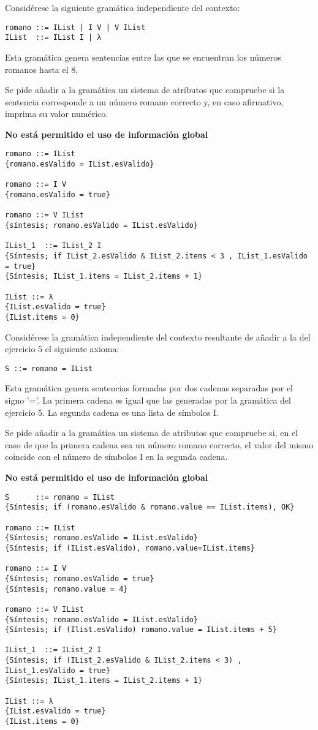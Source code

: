 \begin{problem}[5]
Considérese la siguiente gramática independiente del contexto:
\begin{verbatim}
romano ::= IList | I V | V IList
IList  ::= IList I | λ
\end{verbatim}
Esta gramática genera sentencias entre las que se encuentran los números romanos hasta el 8.

Se pide añadir a la gramática un sistema de atributos que compruebe si la sentencia corresponde a un número romano correcto y, en caso afirmativo, imprima su valor numérico.

\textbf{No está permitido el uso de información global}
\solution
\begin{verbatim}
romano ::= IList
{romano.esValido = IList.esValido}

romano ::= I V
{romano.esValido = true}

romano ::= V IList
{síntesis; romano.esValido = IList.esValido}

IList_1  ::= IList_2 I
{Síntesis; if IList_2.esValido & IList_2.items < 3 , IList_1.esValido = true}
{Síntesis; IList_1.items = IList_2.items + 1}

IList ::= λ
{IList.esValido = true}
{IList.items = 0}
\end{verbatim}
\end{problem}

\begin{problem}[6]
Considérese la gramática independiente del contexto resultante de añadir a la del ejercicio 5 el siguiente axioma:
\begin{verbatim}
S ::= romano = IList
\end{verbatim}
Esta gramática genera sentencias formadas por dos cadenas separadas por el signo '='. La primera cadena es igual que las generadas por la gramática del ejercicio 5. La segunda cadena es una lista de símbolos I.

Se pide añadir a la gramática un sistema de atributos que compruebe si, en el caso de que la primera cadena sea un número romano correcto, el valor del mismo coincide con el número de símbolos I en la segunda cadena.

\textbf{No está permitido el uso de información global}
\solution
\begin{verbatim}
S      ::= romano = IList
{Síntesis; if (romano.esValido & romano.value == IList.items), OK}

romano ::= IList
{Síntesis; romano.esValido = IList.esValido}
{Síntesis; if (IList.esValido), romano.value=IList.items}

romano ::= I V
{Síntesis; romano.esValido = true}
{Síntesis; romano.value = 4}

romano ::= V IList
{Síntesis; romano.esValido = IList.esValido}
{Síntesis; if (Ilist.esValido) romano.value = IList.items + 5}

IList_1  ::= IList_2 I
{Síntesis; if (IList_2.esValido & IList_2.items < 3) , IList_1.esValido = true}
{Síntesis; IList_1.items = IList_2.items + 1}

IList ::= λ
{IList.esValido = true}
{IList.items = 0}
\end{verbatim}
\end{problem}

